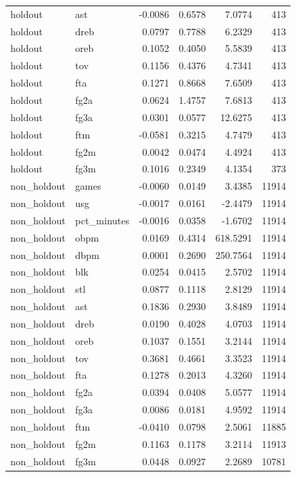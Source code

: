 \begin{table}
\begin{tabular}{llrrrr}
holdout & ast & -0.0086 & 0.6578 & 7.0774 & 413 \\
holdout & dreb & 0.0797 & 0.7788 & 6.2329 & 413 \\
holdout & oreb & 0.1052 & 0.4050 & 5.5839 & 413 \\
holdout & tov & 0.1156 & 0.4376 & 4.7341 & 413 \\
holdout & fta & 0.1271 & 0.8668 & 7.6509 & 413 \\
holdout & fg2a & 0.0624 & 1.4757 & 7.6813 & 413 \\
holdout & fg3a & 0.0301 & 0.0577 & 12.6275 & 413 \\
holdout & ftm & -0.0581 & 0.3215 & 4.7479 & 413 \\
holdout & fg2m & 0.0042 & 0.0474 & 4.4924 & 413 \\
holdout & fg3m & 0.1016 & 0.2349 & 4.1354 & 373 \\
non\_holdout & games & -0.0060 & 0.0149 & 3.4385 & 11914 \\
non\_holdout & usg & -0.0017 & 0.0161 & -2.4479 & 11914 \\
non\_holdout & pct\_minutes & -0.0016 & 0.0358 & -1.6702 & 11914 \\
non\_holdout & obpm & 0.0169 & 0.4314 & 618.5291 & 11914 \\
non\_holdout & dbpm & 0.0001 & 0.2690 & 250.7564 & 11914 \\
non\_holdout & blk & 0.0254 & 0.0415 & 2.5702 & 11914 \\
non\_holdout & stl & 0.0877 & 0.1118 & 2.8129 & 11914 \\
non\_holdout & ast & 0.1836 & 0.2930 & 3.8489 & 11914 \\
non\_holdout & dreb & 0.0190 & 0.4028 & 4.0703 & 11914 \\
non\_holdout & oreb & 0.1037 & 0.1551 & 3.2144 & 11914 \\
non\_holdout & tov & 0.3681 & 0.4661 & 3.3523 & 11914 \\
non\_holdout & fta & 0.1278 & 0.2013 & 4.3260 & 11914 \\
non\_holdout & fg2a & 0.0394 & 0.0408 & 5.0577 & 11914 \\
non\_holdout & fg3a & 0.0086 & 0.0181 & 4.9592 & 11914 \\
non\_holdout & ftm & -0.0410 & 0.0798 & 2.5061 & 11885 \\
non\_holdout & fg2m & 0.1163 & 0.1178 & 3.2114 & 11913 \\
non\_holdout & fg3m & 0.0448 & 0.0927 & 2.2689 & 10781 \\
\bottomrule
\end{tabular}
\end{table}
